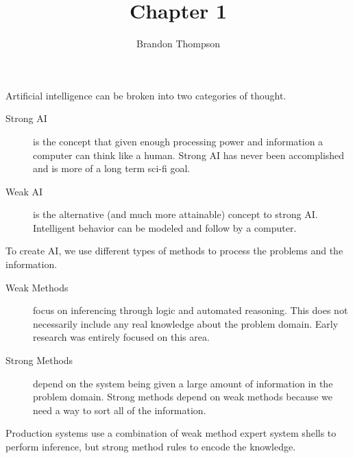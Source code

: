 \documentclass[a4paper]{article}
\begin{document}
	\author{Brandon Thompson}
	\title{Chapter 1}
	\maketitle

	\medskip
	
	Artificial intelligence can be broken into two categories of thought.
	\begin{description}
		\item[Strong AI] 
			is the concept that given enough processing power and
			information a computer can think like a human.
			Strong AI has never been accomplished and is more of a long term sci-fi goal.
		
		\item[Weak AI]
                        is the alternative (and much more attainable) concept
                        to strong AI. Intelligent behavior can be modeled and follow by
                        a computer.
	\end{description}	
	
	To create AI, we use different types of methods to process the problems and the information.
	
	\begin{description}
		\item[Weak Methods]
			focus on inferencing through logic and automated reasoning. This does not
			necessarily include any real knowledge about the problem domain. Early
			research was entirely focused on this area.

		\item[Strong Methods] depend on the system being given a large amount of information
                        in the problem domain. Strong methods depend on weak methods because
                        we need a way to sort all of the information.
	\end{description}
	
	Production systems use a combination of weak method expert system shells to perform
	inference, but strong method rules to encode the knowledge.
	
\end{document}

